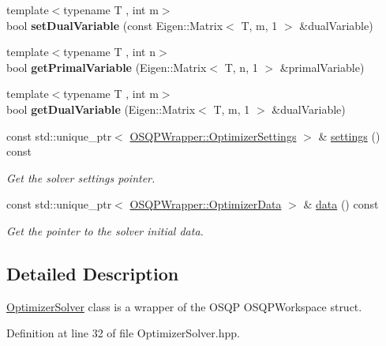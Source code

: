 \begin{DoxyCompactItemize}
\item 
{\footnotesize template$<$typename T , int m$>$ }\\bool {\bfseries set\+Dual\+Variable} (const Eigen\+::\+Matrix$<$ T, m, 1 $>$ \&dual\+Variable)\label{classOSQPWrapper_1_1OptimizerSolver_a244c8be9b6b1e4f47d5441253143fb2c}

\item 
{\footnotesize template$<$typename T , int n$>$ }\\bool {\bfseries get\+Primal\+Variable} (Eigen\+::\+Matrix$<$ T, n, 1 $>$ \&primal\+Variable)\label{classOSQPWrapper_1_1OptimizerSolver_a324e247b470855c6a129d64f947ae2d0}

\item 
{\footnotesize template$<$typename T , int m$>$ }\\bool {\bfseries get\+Dual\+Variable} (Eigen\+::\+Matrix$<$ T, m, 1 $>$ \&dual\+Variable)\label{classOSQPWrapper_1_1OptimizerSolver_adbfa3843773556a7b49e8c1a8ec9b5cb}

\item 
const std\+::unique\+\_\+ptr$<$ \hyperlink{classOSQPWrapper_1_1OptimizerSettings}{O\+S\+Q\+P\+Wrapper\+::\+Optimizer\+Settings} $>$ \& \hyperlink{classOSQPWrapper_1_1OptimizerSolver_ad931c28048f70a530ceabccc41a17a06}{settings} () const 
\begin{DoxyCompactList}\small\item\em Get the solver settings pointer. \end{DoxyCompactList}\item 
const std\+::unique\+\_\+ptr$<$ \hyperlink{classOSQPWrapper_1_1OptimizerData}{O\+S\+Q\+P\+Wrapper\+::\+Optimizer\+Data} $>$ \& \hyperlink{classOSQPWrapper_1_1OptimizerSolver_a672aaa363a5b8602e6e99f760e9b2ce4}{data} () const 
\begin{DoxyCompactList}\small\item\em Get the pointer to the solver initial data. \end{DoxyCompactList}\end{DoxyCompactItemize}


\subsection{Detailed Description}
\hyperlink{classOSQPWrapper_1_1OptimizerSolver}{Optimizer\+Solver} class is a wrapper of the O\+S\+QP O\+S\+Q\+P\+Workspace struct. 

Definition at line 32 of file Optimizer\+Solver.\+hpp.




